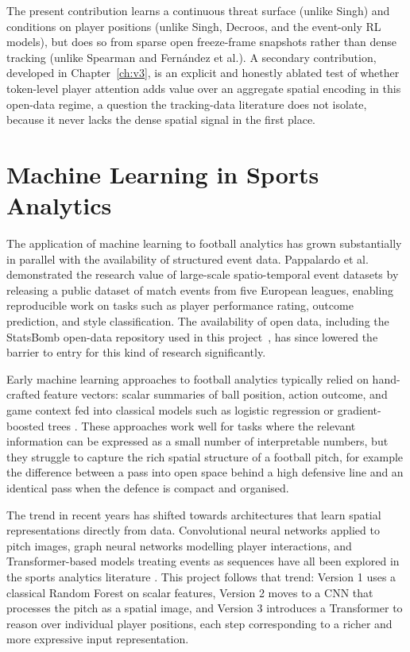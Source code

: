 The present contribution learns a continuous threat surface (unlike Singh) and conditions on player positions (unlike Singh, Decroos, and the event-only RL models), but does so from sparse open freeze-frame snapshots rather than dense tracking (unlike Spearman and Fernández et al.). A secondary contribution, developed in Chapter~\ref{ch:v3}, is an explicit and honestly ablated test of whether token-level player attention adds value over an aggregate spatial encoding in this open-data regime, a question the tracking-data literature does not isolate, because it never lacks the dense spatial signal in the first place.

\section{Machine Learning in Sports Analytics}

The application of machine learning to football analytics has grown substantially in parallel with the availability of structured event data. Pappalardo et al.~\cite{pappalardo2019} demonstrated the research value of large-scale spatio-temporal event datasets by releasing a public dataset of match events from five European leagues, enabling reproducible work on tasks such as player performance rating, outcome prediction, and style classification. The availability of open data, including the StatsBomb open-data repository used in this project~\cite{statsbomb2018}, has since lowered the barrier to entry for this kind of research significantly.

Early machine learning approaches to football analytics typically relied on hand-crafted feature vectors: scalar summaries of ball position, action outcome, and game context fed into classical models such as logistic regression or gradient-boosted trees \cite{lucey2015}. These approaches work well for tasks where the relevant information can be expressed as a small number of interpretable numbers, but they struggle to capture the rich spatial structure of a football pitch, for example the difference between a pass into open space behind a high defensive line and an identical pass when the defence is compact and organised.

The trend in recent years has shifted towards architectures that learn spatial representations directly from data. Convolutional neural networks applied to pitch images, graph neural networks modelling player interactions, and Transformer-based models treating events as sequences have all been explored in the sports analytics literature \cite{yeung2023}. This project follows that trend: Version 1 uses a classical Random Forest on scalar features, Version 2 moves to a CNN that processes the pitch as a spatial image, and Version 3 introduces a Transformer to reason over individual player positions, each step corresponding to a richer and more expressive input representation.

